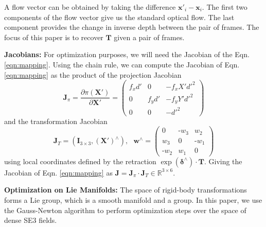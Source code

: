 \documentclass[final]{cvpr}
\begin{document}
A flow vector can be obtained by taking the difference $\mathbf{x}'_{i} - \mathbf{x}_{i}$. The first two components of the flow vector give us the standard optical flow. The last component provides the change in inverse depth between the pair of frames. The focus of this paper is to recover $\mathbf{T}$ given a pair of frames.

\vspace{1mm} \noindent \textbf{Jacobians:} For optimization purposes, we will need the Jacobian of the Eqn. \ref{eqn:mapping}. Using the chain rule, we can compute the Jacobian of Eqn. \ref{eqn:mapping} as the product of the projection Jacobian
\begin{equation}
    \mathbf{J}_{\pi} = \frac{\partial \pi(\mathbf{X}')}{\partial \mathbf{X}'} =
    \begin{pmatrix} 
    f_x d' & 0 & -f_x X' {d'}^2 \\ 
    0 & f_y d' & -f_y Y' {d'}^2 \\
    0 & 0 & -{d'}^2\end{pmatrix}
\end{equation}
and the transformation Jacobian
\begin{equation}
    \mathbf{J}_{T} = 
    \left(\mathbf{I}_{3\times 3},  (\mathbf{X}')^\wedge \right), \ \ \ \mathbf{w}^\wedge = \begin{pmatrix} 0 & \text{-}w_3 & w_2 \\ w_3 & 0 & \text{-}w_1 \\ \text{-}w_2 & w_1 & 0 \end{pmatrix}
\end{equation}
using local coordinates defined by the retraction $\exp(\boldsymbol{\delta}^\wedge)\cdot\mathbf{T}$. Giving the Jacobian of Eqn. \ref{eqn:mapping} as $\mathbf{J} = \mathbf{J}_\pi \cdot \mathbf{J}_T \in \mathbb{R}^{3\times 6}$.

\vspace{1mm} \noindent \textbf{Optimization on Lie Manifolds:} The space of rigid-body transformations forms a Lie group, which is a smooth manifold and a group. In this paper, we use the Gauss-Newton algorithm to perform optimization steps over the space of dense SE3 fields. 
\end{document}
